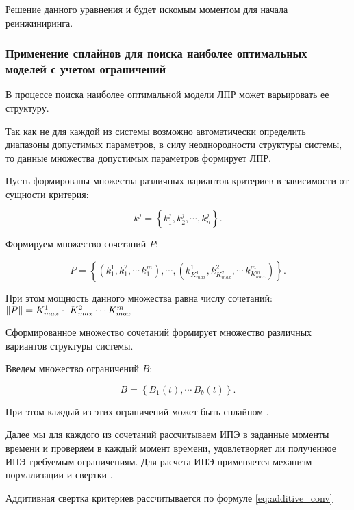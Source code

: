 Решение данного уравнения и будет искомым моментом для начала реинжиниринга.

\subsubsection{Применение сплайнов для поиска наиболее оптимальных моделей с учетом ограничений}
В процессе поиска наиболее оптимальной модели ЛПР может варьировать ее структуру.

Так как не для каждой из системы возможно автоматически определить диапазоны допустимых параметров, 
в силу неоднородности структуры системы, то данные множества допустимых параметров формирует ЛПР.

Пусть формированы множества различных вариантов критериев в зависимости от сущности критерия:

\begin{equation}
    k^j=\left\{ k_1^j,k_2^j, \cdots ,k_n^j \right\}.
\end{equation}
\vspace{\belowdisplayshortskip}

Формируем множество сочетаний $P$: 

\begin{equation}
    P=\left\{ (k^1_1, k^2_1, \cdots\, k^m_1), \cdots , (k^1_{K^1_{max}}, k^2_{K^2_{max}}, \cdots\, k^m_{K^m_{max}}) \right\}.
\end{equation}

При этом мощность данного множества равна числу сочетаний: $ \norm{P} = K^1_{max} \cdot \ K^2_{max} \cdots  K^m_{max} $

Сформированное множество сочетаний формирует множество различных вариантов структуры системы.

Введем множество ограничений $B$:

\begin{equation}
    B = \left\{ B_1(t),\cdots\, B_b(t) \right\}.
\end{equation}
\vspace{\belowdisplayshortskip}

При этом каждый из этих ограничений может быть сплайном \cite{Degradation}.

Далее мы для каждого из сочетаний рассчитываем ИПЭ в заданные моменты времени и проверяем в каждый момент времени, удовлетворяет ли полученное ИПЭ требуемым ограничениям.
Для расчета ИПЭ применяется механизм нормализации и свертки \cite{Degradation}.

Аддитивная свертка критериев рассчитывается по формуле \ref{eq:additive_conv}

